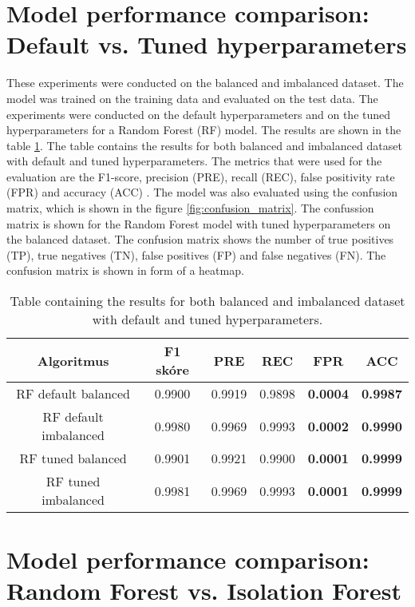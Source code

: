 \section{Model performance comparison: Default vs. Tuned hyperparameters}

These experiments were conducted on the balanced and imbalanced dataset. The model was trained on the training data and evaluated on the test data.
The experiments were conducted on the default hyperparameters and on the tuned hyperparameters for a Random Forest (RF) model.
The results are shown in the table \ref{result_normal}.
The table contains the results for both balanced and imbalanced dataset with default and tuned hyperparameters. The metrics 
that were used for the evaluation are the F1-score, precision (PRE), recall (REC), false positivity rate (FPR) and accuracy (ACC) . 
The model was also evaluated using the confusion matrix, which is shown in the figure \ref{fig:confusion_matrix}. 
The confussion matrix is shown for the Random Forest model with tuned hyperparameters on the balanced dataset. 
The confusion matrix shows the number of true positives (TP), true negatives (TN), false positives (FP) and false negatives (FN). 
The confusion matrix is shown in form of a heatmap.

\begin{table}[h]
    \centering
    \label{result_normal}
    \begin{tabular}{|c|c|c|c|c|c|}
    \hline
    \textbf{Algoritmus} & \textbf{F1 skóre} & \textbf{PRE} & \textbf{REC} & \textbf{FPR} & \textbf{ACC} \\ \hline
    RF default balanced       & 0.9900 & 0.9919 & 0.9898 & \textbf{0.0004} & \textbf{0.9987}\\ \hline
    RF default imbalanced     & 0.9980 & 0.9969 & 0.9993 & \textbf{0.0002} & \textbf{0.9990}\\ \hline
    RF tuned balanced         & 0.9901 & 0.9921 & 0.9900 & \textbf{0.0001} & \textbf{0.9999}\\ \hline
    RF tuned imbalanced       & 0.9981 & 0.9969 & 0.9993 & \textbf{0.0001} & \textbf{0.9999}\\ \hline
    \end{tabular}
    \caption{Table containing the results for both balanced and imbalanced dataset with default and tuned hyperparameters.}    
\end{table}

\section{Model performance comparison: Random Forest vs. Isolation Forest}

